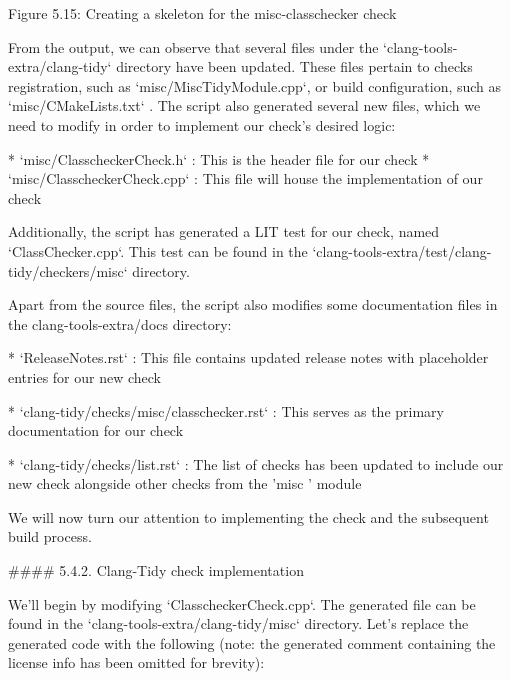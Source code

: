 \begin{markdown}

\begin{center}
Figure 5.15: Creating a skeleton for the misc-classchecker check
\end{center}

From the output, we can observe that several files under the `clang-tools-extra/clang-tidy` directory have been updated. These files pertain to checks registration, such as `misc/MiscTidyModule.cpp`, or build configuration, such as `misc/CMakeLists.txt` . The script also generated several new files, which we need to modify in order to implement our check's desired logic:

* `misc/ClasscheckerCheck.h` : This is the header file for our check
* `misc/ClasscheckerCheck.cpp` : This file will house the implementation of our check

Additionally, the script has generated a LIT test for our check, named `ClassChecker.cpp`. This test can be found in the `clang-tools-extra/test/clang-tidy/checkers/misc` directory.

Apart from the source files, the script also modifies some documentation files in the clang-tools-extra/docs directory:

* `ReleaseNotes.rst` : This file contains updated release notes with placeholder entries for our new check

* `clang-tidy/checks/misc/classchecker.rst` : This serves as the primary documentation for our check

* `clang-tidy/checks/list.rst` : The list of checks has been updated to include our new check alongside other checks from the 'misc ' module

We will now turn our attention to implementing the check and the subsequent build process.

#### 5.4.2. Clang-Tidy check implementation

We'll begin by modifying `ClasscheckerCheck.cpp`. The generated file can be found in the `clang-tools-extra/clang-tidy/misc` directory. Let's replace the generated code with the following (note: the generated comment containing the license info has been omitted for brevity):

\end{markdown}

